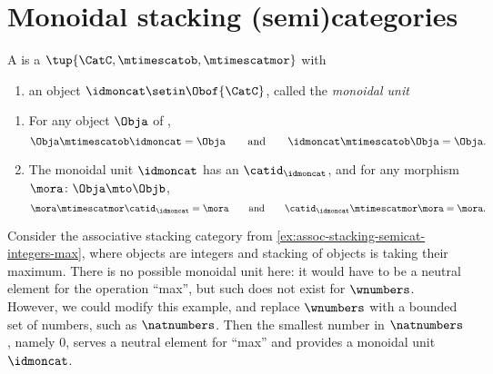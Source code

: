 
\section{Monoidal stacking (semi)categories}\label{sec:moinoidal-stacking}

\begin{ctdefinition}
    \label{def:strict-monoidal-stacking-semicat}
    A  is a  $\tup{\CatC, \mtimescatob, \mtimescatmor}$ with

    \constit

    \begin{enumerate}
        \item an object $\idmoncat \setin \Obof{\CatC}$, called the \emph{monoidal unit}
    \end{enumerate}

    \condit

    \begin{enumerate}
        \item For any object $\Obja$ of \CatC,
              \begin{equation}\label{eq:strict-mon-stacking-semicat-cond1}
                  \Obja \mtimescatob \idmoncat = \Obja \qquad \text{and} \qquad \idmoncat \mtimescatob \Obja = \Obja.
              \end{equation}
        \item The monoidal unit $\idmoncat$ has an  $\catid_\idmoncat$, and for any morphism $\mora \colon \Obja \mto \Objb$,
              \begin{equation}\label{eq:strict-mon-stacking-semicat-cond2}
                  \mora \mtimescatmor \catid_\idmoncat = \mora \qquad \text{and} \qquad \catid_\idmoncat \mtimescatmor  \mora = \mora.
              \end{equation}
    \end{enumerate}
\end{ctdefinition}


\begin{example}
    Consider the associative stacking category from \cref{ex:assoc-stacking-semicat-integers-max}, where objects are integers and stacking of objects is taking their maximum.
    There is no possible monoidal unit here: it would have to be a neutral element for the operation ``max'', but such does not exist for $\wnumbers$.
    However, we could modify this example, and replace $\wnumbers$ with a bounded set of numbers, such as $\natnumbers$.
    Then the smallest number in $\natnumbers$, namely $0$, serves a neutral element for ``max'' and provides a monoidal unit $\idmoncat$.
\end{example}

